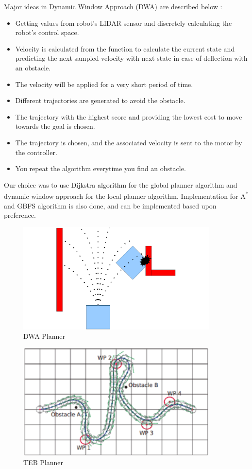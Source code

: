 Major ideas in Dynamic Window Approach (DWA) are described below : 
\begin{itemize}
    \item Getting values from robot's LIDAR sensor and discretely calculating the robot's control space.
    \item Velocity is calculated from the function to calculate the current state and predicting the next sampled velocity with next state in case of deflection with an obstacle.
    \item The velocity will be applied for a very short period of time.
    \item Different trajectories are generated to avoid the obstacle.
    \item The trajectory with the highest score and providing the lowest cost to move towards the goal is chosen.
    \item The trajectory is chosen, and the associated velocity is sent to the motor by the controller. 
    \item You repeat the algorithm everytime you find an obstacle. 
\end{itemize}

Our choice was to use Dijkstra algorithm for the global planner algorithm and dynamic window approach for the local planner algorithm.
Implementation for A\textsuperscript{*} and GBFS algorithm is also done, and can be implemented based upon preference.

\begin{figure}[th]
    \centering
    \includegraphics[width=0.9\textwidth]{Figures/dwa_planner.png}
    \decoRule
    \caption[]{DWA Planner}
    \label{fig:DWAPlanner}
\end{figure}

\begin{figure}[th]
    \centering
    \includegraphics[width=0.9\textwidth]{Figures/TEB.png}
    \decoRule
    \caption[]{TEB Planner}
    \label{fig:TEBPlanner}
\end{figure}


